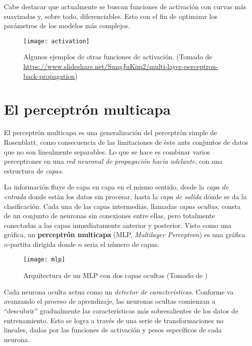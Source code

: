 Cabe destacar que actualmente se buscan funciones de activación con
curvas más suavizadas y, sobre todo, diferenciables. Esto con el fin
de optimizar los parámetros de los modelos más complejos.

\begin{figure}[H]
  \texttt{[image: activation]} \centering
  \caption{Algunos ejemplos de otras funciones de activación.  (Tomado
    de
    \url{https://www.slideshare.net/SungJuKim2/multi-layer-perceptron-back-propagation})}
\end{figure}

\section{El perceptrón multicapa}
El perceptrón multicapa es una generalización del perceptrón simple de
Rosenblatt, como consecuencia de las limitaciones de éste ante
conjuntos de datos que no son linealmente separables. Lo que se hace
es combinar varios perceptrones en una \textit{red neuronal de
  propagación hacia adelante}, con una estructura de \textit{capas}.

La información fluye de capa en capa en el mismo sentido, desde la
\textit{capa de entrada} donde están los datos sin procesar, hasta la
\textit{capa de salida} dónde se da la clasificación. Cada una de las capas
intermedias, llamadas \textit{capas ocultas}, consta de un conjunto de
neuronas sin conexiones entre ellas, pero totalmente conectadas a las
capas inmediatamente anterior y posterior. Visto como una gráfica, un
\textbf{perceptrón multicapa} (MLP, \textit{Multilayer Perceptron})
es una gráfica $n$-partita dirigida donde $n$ seria el número de
capas.
\begin{figure}[H]
  \texttt{[image: mlp]} \centering \caption{Arquitectura de
  un MLP con dos capas ocultas (Tomado de \cite{haykin})}
\end{figure}
Cada neurona oculta actua como un \textit{detector de
  características}. Conforme va avanzando el proceso de aprendizaje,
las neuronas ocultas comienzan a ``descubrir'' gradualmente las
características más sobresalientes de los datos de entrenamiento.
Esto se logra a través de una serie de transformaciones no lineales,
dadas por las funciones de activación y pesos específicos de cada
neurona.

